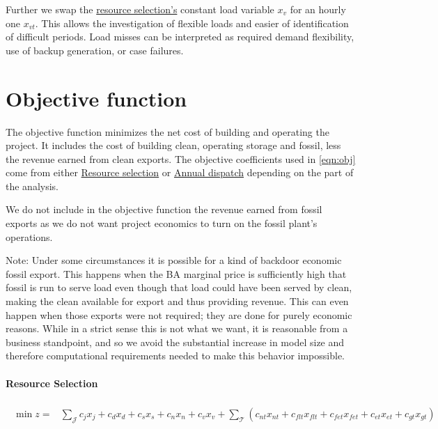 \documentclass[9pt, oneside]{article}
\numberwithin{equation}{subsubsection}
\begin{document}
Further we swap the \hyperref[sec:res]{resource selection's} constant load variable $x_v$ for an hourly one $x_{vt}$.
This allows the investigation of flexible loads and easier of identification of difficult periods.
Load misses can be interpreted as required demand flexibility, use of backup generation, or case failures.

\section{Objective function}\label{sec:objfun}
The objective function minimizes the net cost of building and operating
the project. It includes the cost of building clean, operating storage
and fossil, less the revenue earned from clean exports. The objective
coefficients used in \ref{eqn:obj} come from either
\hyperref[sec:res]{Resource selection} or
\hyperref[sec:anndisp]{Annual dispatch} depending on the part of the analysis.

We do not include in the objective function the revenue earned from fossil exports as we do not want project economics to turn on the fossil plant’s operations.

Note: Under some circumstances it is possible for a kind of backdoor
economic fossil export. This happens when the BA marginal price is
sufficiently high that fossil is run to serve load even though that load
could have been served by clean, making the clean available for export
and thus providing revenue. This can even happen when those exports were
not required; they are done for purely economic reasons. While in a
strict sense this is not what we want, it is reasonable from a business
standpoint, and so we avoid the substantial increase in model size and
therefore computational requirements needed to make this behavior impossible.

\paragraph{Resource Selection}
\begin{align}
	\begin{split}
		\min z = & \sum_{\mathcal{J}} c_{j}x_{j} + c_{d}x_{d} + c_{s}x_{s} + c_{n}x_{n} + c_{v}x_{v} + \sum_{\mathcal{T}} \left( c_{nt} x_{nt} + c_{flt} x_{flt}+ c_{fet} x_{fet} + c_{et} x_{et} + c_{gt} x_{gt} \right) \label{eqn:obj}
	\end{split}
\end{align}
\end{document}
